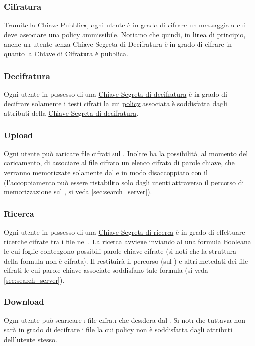 \documentclass[a4paper,twoside,10pt,openany]{scrbook}
\begin{document}
\subsubsection{Cifratura}\label{sec:user_enc}
Tramite la \hyperref[sec:pk]{Chiave Pubblica}, ogni utente è in grado di cifrare un messaggio a cui deve associare una \hyperref[sec:create_policy]{policy} ammissibile. 
Notiamo che quindi, in linea di principio, anche un utente senza Chiave Segreta di Decifratura è in grado di cifrare in quanto la Chiave di Cifratura è pubblica. 
%
\subsubsection{Decifratura}\label{sec:user_dec}
Ogni utente in possesso di una \hyperref[sec:sk]{Chiave Segreta di decifratura} è in grado di decifrare solamente i testi cifrati la cui \hyperref[sec:create_policy]{policy} associata è soddisfatta dagli attributi della \hyperref[sec:sk]{Chiave Segreta di decifratura}.
%
\subsubsection{Upload}\label{sec:user_upload}
Ogni utente può caricare file cifrati sul \sa.
Inoltre ha la possibilità, al momento del caricamento, di associare al file cifrato un elenco cifrato di parole chiave, che verranno memorizzate solamente dal \sr e in modo disaccoppiato con il \sa (l'accoppiamento può essere ristabilito solo dagli utenti attraverso il percorso di memorizzazione sul \sa, si veda \ref{sec:search_server}).
%
\subsubsection{Ricerca}\label{sec:user_search}
Ogni utente in possesso di una \hyperref[sec:sk]{Chiave Segreta di ricerca} è in grado di effettuare ricerche cifrate tra i file nel \sa. 
La ricerca avviene inviando al \sr una formula Booleana le cui foglie contengono possibili parole chiave cifrate (si noti che la struttura della formula non è cifrata). Il \sr restituirà il percorso (sul \sa) e altri metedati dei file cifrati le cui parole chiave associate soddisfano tale formula (si veda \ref{sec:search_server}).
%
\subsubsection{Download}\label{sec:user_download}
Ogni utente può scaricare i file cifrati che desidera dal \sa.
Si noti che tuttavia non sarà in grado di decifrare i file la cui policy non è soddisfatta dagli attributi dell'utente stesso.
%
\end{document}
